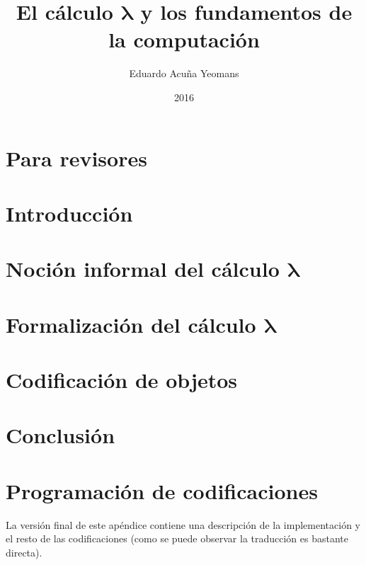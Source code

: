 \documentclass[letterpaper,twoside,openright,11pt]{book}
\newcommand{\bs}{\boldsymbol}
\theoremstyle{indented}
\begin{document}
\title{El cálculo \( \bs{λ} \) y los fundamentos de la computación}
\author{Eduardo Acuña Yeomans}
\date{2016}

\maketitle

\frontmatter
\tableofcontents

\mainmatter
\chapter*{Para revisores}
\markboth{}{}


\chapter*{Introducción}
\label{ch:introduccion}


\chapter{\texorpdfstring{Noción informal del cálculo \( \bs{λ} \)}{Noción informal del cálculo lambda}}
\label{ch:nocion-informal}


\chapter{\texorpdfstring{Formalización del cálculo \( \bs{λ} \)}{Formalización del cálculo lambda}}
\label{ch:formalizacion}


\chapter{Codificación de objetos}
\label{ch:codificacion}


\chapter*{Conclusión}
\label{ch:conclusion}


\appendix

\chapter{Programación de codificaciones}
\label{ap:lambda-scheme}
\begin{Eduardo}
La versión final de este apéndice contiene una descripción de la implementación y el resto de las codificaciones (como se puede observar la traducción es bastante directa).
\end{Eduardo}

\end{document}
